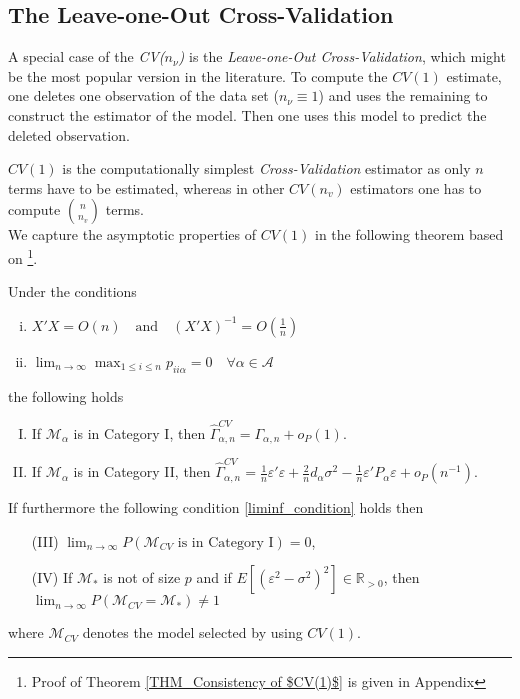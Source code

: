 \documentclass[Research_Module_ES.tex]{subfiles}
\begin{document}
\subsection{The Leave-one-Out Cross-Validation}
A special case of the \textit{CV($n_\nu$)} is the \textit{Leave-one-Out Cross-Validation}, which might be the most popular version in the literature.
To compute the $CV(1)$ estimate, one deletes one observation of the data set ($n_\nu\equiv1$) and uses the remaining to construct the estimator of the model. Then one uses this model to predict the
deleted observation.

$CV(1)$ is the computationally simplest \textit{Cross-Validation} estimator as only $n$ terms have to be estimated, whereas in other $CV(n_v)$ estimators one has to compute $\binom{n}{n_v}$ terms.\\

We capture the asymptotic properties of $CV(1)$ in the following theorem based on \cite{shao}\footnote{Proof of Theorem \ref{THM_Consistency of $CV(1)$} is given in Appendix }.

\begin{thm}
Under the conditions 
\label{THM_Consistency of $CV(1)$}
\begin{enumerate}[(i)]
\item $X'X = O(n) \quad \textrm{and} \quad (X'X)^{-1}=O(\frac{1}{n})$
\item $ \lim_{n \to \infty} \max_{1\le i\le n} p_{ii\alpha} =0 \quad \forall \alpha \in \mathcal{A} $ 
\end{enumerate}
the following holds
\begin{enumerate}[(I)]
\item If $\mathcal{M}_\alpha$ is in Category I, then $\hat{\Gamma}_{\alpha,n}^{CV} = \Gamma_{\alpha,n} + o_P(1)$.
\item If $\mathcal{M}_\alpha$ is in Category II, then $\hat{\Gamma}_{\alpha,n}^{CV} = \frac{1}{n}\varepsilon'\varepsilon + \frac{2}{n}d_\alpha\sigma^2 - \frac{1}{n}\varepsilon'P_\alpha\varepsilon + o_P(n^{-1})$.
\end{enumerate}
If furthermore the following condition \ref{liminf_condition} holds
then 
\begin{enumerate}
\item[(III)] $\lim_{n\to\infty} P(\mathcal{M}_{CV}\textrm{ is in Category I})=0$,
\item[(IV)]If $\mathcal{M}_\ast$ is not of size $p$ and if $E[(\varepsilon^2-\sigma^2)^2]\in\mathbb{R}_{>0}$, then \\\mbox{$\lim_{n\to\infty}P(\mathcal{M}_{CV}=\mathcal{M}_\ast) \neq 1$}
\end{enumerate}
where $\mathcal{M}_{CV}$ denotes the model selected by using $CV(1)$.
\end{thm}
\end{document}
